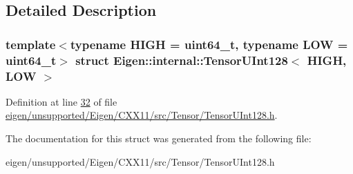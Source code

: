 \subsection{Detailed Description}
\subsubsection*{template$<$typename H\+I\+GH = uint64\+\_\+t, typename L\+OW = uint64\+\_\+t$>$\newline
struct Eigen\+::internal\+::\+Tensor\+U\+Int128$<$ H\+I\+G\+H, L\+O\+W $>$}



Definition at line \hyperlink{eigen_2unsupported_2_eigen_2_c_x_x11_2src_2_tensor_2_tensor_u_int128_8h_source_l00032}{32} of file \hyperlink{eigen_2unsupported_2_eigen_2_c_x_x11_2src_2_tensor_2_tensor_u_int128_8h_source}{eigen/unsupported/\+Eigen/\+C\+X\+X11/src/\+Tensor/\+Tensor\+U\+Int128.\+h}.



The documentation for this struct was generated from the following file\+:\begin{DoxyCompactItemize}
\item 
eigen/unsupported/\+Eigen/\+C\+X\+X11/src/\+Tensor/\+Tensor\+U\+Int128.\+h\end{DoxyCompactItemize}
